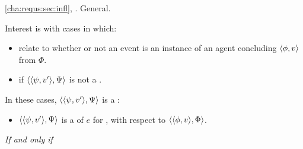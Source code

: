 \begin{note}
  \autoref{cha:requs:sec:infl}, \ninf{}.
  General.

  Interest is with cases in which:
  \begin{itemize}
  \item
    \ninf{} relate to whether or not an event is an instance of an agent concluding \(\langle \phi, v \rangle\) from \(\Phi\).
  \item
    \ninf{} if \(\langle \langle \psi, v' \rangle, \Psi \rangle\) is not a \fc{}.
  \end{itemize}

  In these cases, \(\langle \langle \psi, v' \rangle, \Psi \rangle\) is a \requ{}:

  \begin{definition}[A \requ{0}]
    \label{def:requ}

    \begin{itemize}
    \item
      \(\langle \langle \psi, v' \rangle, \Psi \rangle\) is a \emph{\requ{}} of \(e\) for \vAgent{}, with respect to \(\langle \langle \phi, v \rangle, \Phi \rangle\).
    \end{itemize}

    \emph{If and only if}


\end{definition}
\end{note}
